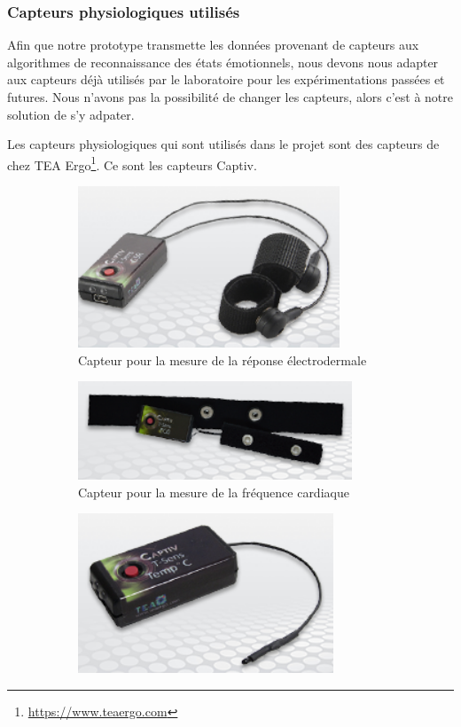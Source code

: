 \documentclass{article}
\begin{document}
		\subsubsection{Capteurs physiologiques utilisés}\label{sec:capteurs}
			Afin que notre prototype transmette les données provenant de capteurs aux algorithmes de reconnaissance des états émotionnels, nous devons nous adapter aux capteurs déjà utilisés par le laboratoire pour les expérimentations passées et futures.
			Nous n'avons pas la possibilité de changer les capteurs, alors c'est à notre solution de s'y adpater.\par
			Les capteurs physiologiques qui sont utilisés dans le projet sont des capteurs de chez TEA Ergo\footnote{\href{https://www.teaergo.com}{https://www.teaergo.com}}.
			Ce sont les capteurs Captiv.
			\begin{figure}
				\begin{subfigure}{0.5\textwidth}
					\centering
					\includegraphics[scale=0.5]{../include/TEAgsr.PNG}
					\caption{Capteur pour la mesure de la réponse électrodermale}
					\label{fig:gsr}
				\end{subfigure}
				\begin{subfigure}{0.5\textwidth}
					\centering
					\includegraphics[scale=0.5]{../include/TEAhr.PNG}
					\caption{Capteur pour la mesure de la fréquence cardiaque}
					\label{fig:hr}
				\end{subfigure}\newline
				\begin{subfigure}{0.5\textwidth}
					\centering
					\includegraphics[scale=0.5]{../include/TEAbt.PNG}

\end{subfigure}
\end{figure}
\end{document}
